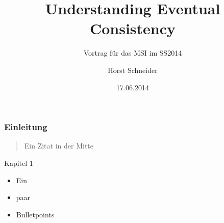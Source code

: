 \documentclass[11pt]{beamer}
\author{Horst Schneider}
\title{Understanding Eventual Consistency}
\subtitle{Vortrag für das MSI im SS2014}
\institute{Hochschule Mannheim}
\date{17.06.2014}
\begin{document}
\begin{frame}
\titlepage
\end{frame}


\begin{frame}
\frametitle{Einleitung}
\begin{quotation}
\glqq Ein Zitat in der Mitte\grqq
\end{quotation}
\end{frame}

\begin{frame}{Kapitel 1}
\begin{itemize}
\item Ein
\item paar
\item Bulletpoints
\end{itemize}
\end{frame}
\end{document}
